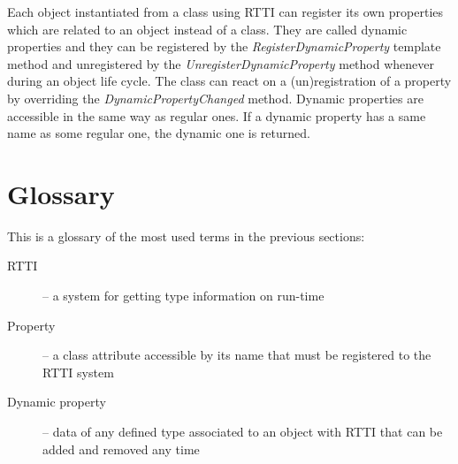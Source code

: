 \documentclass[a4paper, 12pt]{report}
\begin{document}
Each object instantiated from a class using RTTI can register its own properties which are related to an object instead of a class. They are called dynamic properties and they can be registered by the \emph{RegisterDynamicProperty} template method and unregistered by the \emph{UnregisterDynamicProperty} method whenever during an object life cycle. The class can react on a (un)registration of a property by overriding the \emph{DynamicPropertyChanged} method. Dynamic properties are accessible in the same way as regular ones. If a dynamic property has a same name as some regular one, the dynamic one is returned.


\section{Glossary}
This is a glossary of the most used terms in the previous sections:

\begin{description}
  \item[RTTI] -- a system for getting type information on run-time
  \item[Property] -- a class attribute accessible by its name that must be registered to the RTTI system
  \item[Dynamic property] -- data of any defined type associated to an object with RTTI that can be added and removed any time
\end{description}



\end{document}
